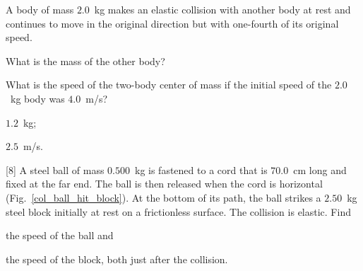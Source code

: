 \begin{problem}
	A body of mass $2.0$~kg makes an elastic collision with another body at rest and continues to move in the original direction but with one-fourth of its original speed.
	\begin{enumerate*}[label=(\alph*)]
		\item What is the mass of the other body?
		\item What is the speed of the two-body center of mass if the initial speed of the $2.0$~kg body was $4.0$~m/s? 
	\end{enumerate*}
	\begin{solution}
		\begin{enumerate*}[label=(\alph*)]
			\item $1.2$~kg; 
			\item $2.5$~m/s.
		\end{enumerate*}
	\end{solution}
\end{problem}


\begin{problem}\label{prb:col_ball_hit_block}
	[8]%
	A steel ball of mass $0.500$~kg is fastened to a cord that is $70.0$~cm long and fixed at the far end. The ball is then released when the cord is horizontal (Fig.~\ref{col_ball_hit_block}). At the bottom of its path, the ball strikes a $2.50$~kg steel block initially at rest on a frictionless surface. The collision is elastic. Find 
	\begin{enumerate*}[label=(\alph*)]
		\item the speed of the ball 
		and
		\item the speed of the block, both just after the collision.
	\end{enumerate*}
\end{problem}


